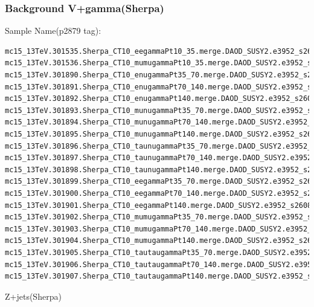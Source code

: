 \documentclass[mathserif,serif]{beamer}
\begin{document}
\begin{frame}[fragile]
\frametitle{Background V+gamma(Sherpa)}
\small
Sample Name(p2879 tag):
\tiny
\begin{verbatim}
mc15_13TeV.301535.Sherpa_CT10_eegammaPt10_35.merge.DAOD_SUSY2.e3952_s2608_s2183_r7725_r7676_p2879
mc15_13TeV.301536.Sherpa_CT10_mumugammaPt10_35.merge.DAOD_SUSY2.e3952_s2608_s2183_r7725_r7676_p2879
mc15_13TeV.301890.Sherpa_CT10_enugammaPt35_70.merge.DAOD_SUSY2.e3952_s2608_s2183_r7725_r7676_p2879
mc15_13TeV.301891.Sherpa_CT10_enugammaPt70_140.merge.DAOD_SUSY2.e3952_s2608_s2183_r7725_r7676_p2879
mc15_13TeV.301892.Sherpa_CT10_enugammaPt140.merge.DAOD_SUSY2.e3952_s2608_s2183_r7725_r7676_p2879
mc15_13TeV.301893.Sherpa_CT10_munugammaPt35_70.merge.DAOD_SUSY2.e3952_s2608_s2183_r7725_r7676_p2879
mc15_13TeV.301894.Sherpa_CT10_munugammaPt70_140.merge.DAOD_SUSY2.e3952_s2608_s2183_r7725_r7676_p2879
mc15_13TeV.301895.Sherpa_CT10_munugammaPt140.merge.DAOD_SUSY2.e3952_s2608_s2183_r7725_r7676_p2879
mc15_13TeV.301896.Sherpa_CT10_taunugammaPt35_70.merge.DAOD_SUSY2.e3952_s2608_s2183_r7725_r7676_p2879
mc15_13TeV.301897.Sherpa_CT10_taunugammaPt70_140.merge.DAOD_SUSY2.e3952_s2608_s2183_r7725_r7676_p2879
mc15_13TeV.301898.Sherpa_CT10_taunugammaPt140.merge.DAOD_SUSY2.e3952_s2608_s2183_r7725_r7676_p2879
mc15_13TeV.301899.Sherpa_CT10_eegammaPt35_70.merge.DAOD_SUSY2.e3952_s2608_s2183_r7725_r7676_p2879
mc15_13TeV.301900.Sherpa_CT10_eegammaPt70_140.merge.DAOD_SUSY2.e3952_s2608_s2183_r7725_r7676_p2879
mc15_13TeV.301901.Sherpa_CT10_eegammaPt140.merge.DAOD_SUSY2.e3952_s2608_s2183_r7725_r7676_p2879
mc15_13TeV.301902.Sherpa_CT10_mumugammaPt35_70.merge.DAOD_SUSY2.e3952_s2608_s2183_r7725_r7676_p2879
mc15_13TeV.301903.Sherpa_CT10_mumugammaPt70_140.merge.DAOD_SUSY2.e3952_s2608_s2183_r7725_r7676_p2879
mc15_13TeV.301904.Sherpa_CT10_mumugammaPt140.merge.DAOD_SUSY2.e3952_s2608_s2183_r7725_r7676_p2879
mc15_13TeV.301905.Sherpa_CT10_tautaugammaPt35_70.merge.DAOD_SUSY2.e3952_s2608_s2183_r7725_r7676_p2879
mc15_13TeV.301906.Sherpa_CT10_tautaugammaPt70_140.merge.DAOD_SUSY2.e3952_s2608_s2183_r7725_r7676_p2879
mc15_13TeV.301907.Sherpa_CT10_tautaugammaPt140.merge.DAOD_SUSY2.e3952_s2608_s2183_r7725_r7676_p2879
\end{verbatim}
\end{frame}

\begin{frame}
\begin{center}
\huge
Z+jets(Sherpa)
\end{center}
\end{frame}
\end{document}
